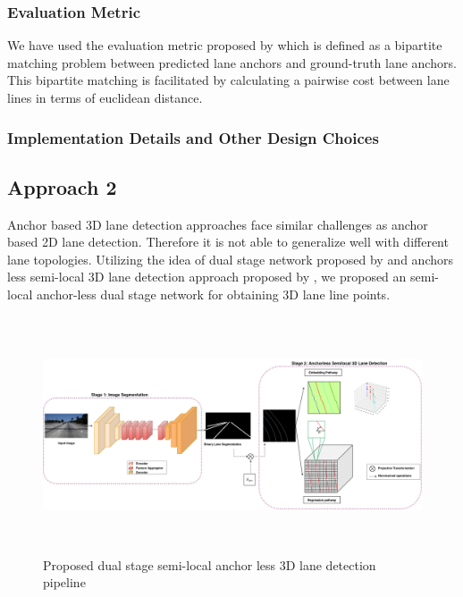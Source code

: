            \subsubsection{Evaluation Metric}
            
            We have used the evaluation metric proposed by \cite{guo2020gen} which is defined as a bipartite matching problem between predicted lane anchors and ground-truth lane anchors. This bipartite matching is facilitated by calculating a pairwise cost between lane lines in terms of euclidean distance. 
        
            \subsubsection{Implementation Details and Other Design Choices}
        
        \subsection{Approach 2}
        
        
        Anchor based 3D lane detection approaches face similar challenges as anchor based 2D lane detection. Therefore it is not able to generalize well with different lane topologies. Utilizing the idea of dual stage network proposed by \cite{guo2020gen} and anchors less semi-local 3D lane detection approach proposed by \cite{DBLP:journals/corr/abs-2011-01535}, we proposed an semi-local anchor-less dual stage network for obtaining 3D lane line points.
        
        \begin{figure}[h]
    \centering
    \includegraphics[width=\textwidth, height=7cm]{images/3DlaneAUXNet.png}
    \caption{Proposed dual stage semi-local anchor less 3D lane detection pipeline  \cite{guo2020gen}}
    \end{figure}
        
